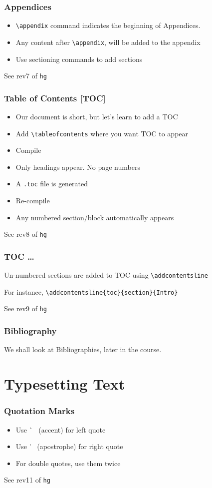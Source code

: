 \documentclass{beamer}
\newcommand{\typ}[1]{\lstinline{#1}}
\begin{document}
\begin{frame}[fragile]
  \frametitle{Appendices}
  \begin{itemize}
  \item \lstinline{\appendix} command indicates the beginning of
    Appendices. 
  \item Any content after \lstinline{\appendix}, will be added to the
    appendix 
  \item Use sectioning commands to add sections
  \end{itemize}
  \tiny See rev7 of \typ{hg}
\end{frame}

\begin{frame}[fragile]
  \frametitle{Table of Contents [TOC]}
  \begin{itemize}
  \item Our document is short, but let's learn to add a TOC
  \item Add \lstinline{\tableofcontents} where you want TOC to
    appear
  \item Compile
  \item Only headings appear. No page numbers
  \item A \lstinline{.toc} file is generated
  \item Re-compile
  \item Any numbered section/block automatically appears
  \end{itemize}
  \tiny See rev8 of \typ{hg}
\end{frame}

\begin{frame}[fragile]
  \frametitle{TOC \ldots}
  \begin{itemize}
  \item Un-numbered sections are added to TOC using
    \lstinline{\addcontentsline}
  \item For instance,  \lstinline+\addcontentsline{toc}{section}{Intro}+
  \end{itemize}
  \tiny See rev9 of \typ{hg}
\end{frame}

\begin{frame}
  \frametitle{Bibliography}
  We shall look at Bibliographies, later in the course. 
\end{frame}

\section{Typesetting Text}
\begin{frame}[fragile]
  \frametitle{Quotation Marks}
  \begin{itemize}
  \item Use \`~ (accent) for left quote
  \item Use \'~ (apostrophe) for right quote
  \item For double quotes, use them twice
  \end{itemize}
  \tiny See rev11 of \typ{hg}
\end{frame}
\end{document}
